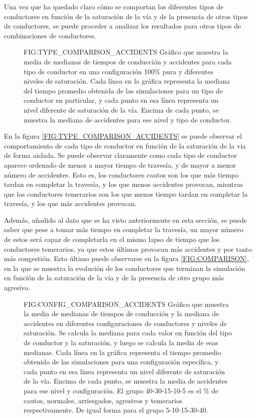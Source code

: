 Una vez que ha quedado claro cómo se comportan los diferentes tipos de conductores en función de la saturación de la vía y de la presencia
de otros tipos de conductores, se puede proceder a analizar los resultados para otros tipos de combinaciones de conductores.

\begin{figure}[Comparación de tiempos y accidentes por tipo de conductor]{FIG:TYPE_COMPARISON_ACCIDENTS}{
    Gráfico que muestra la media de medianas de tiempos de conducción y accidentes para cada tipo de conductor en una configuración 100\% pura y diferentes niveles de saturación.
    Cada línea en la gráfica representa la mediana del tiempo promedio obtenida de las simulaciones para un tipo de conductor en particular, y cada punto en esa línea representa un nivel diferente de saturación de la vía.
    Encima de cada punto, se muestra la mediana de accidentes para ese nivel y tipo de conductor.
}
\end{figure}

En la figura \ref{FIG:TYPE_COMPARISON_ACCIDENTS} se puede observar el comportamiento de cada tipo de conductor en función de la saturación de la vía
de forma aislada. Se puede observar claramente como cada tipo de conductor aparece ordenado de menor a mayor tiempo de travesía, y de mayor a menor
número de accidentes. Esto es, los conductores cautos son los que más tiempo tardan en completar la travesía, y los que menos accidentes provocan,
mientras que los conductores temerarios son los que menos tiempo tardan en completar la travesía, y los que más accidentes provocan.

Además, añadido al dato que se ha visto anteriormente en esta sección, se puede saber que pese a tomar más tiempo en completar la travesía,
un mayor número de estos será capaz de completarla en el mismo lapso de tiempo que los conductores temerarios, ya que estos últimos provocan
más accidentes y por tanto más congestión. Esto último puede observarse en la figura \ref{FIG:COMPARISON}, en la que se muestra la evolución
de los conductores que terminan la simulación en función de la saturación de la vía y de la presencia de otro grupo más agresivo.

\begin{figure}[Mediana de tiempos y accidentes en diferentes distribuciones]{FIG:CONFIG_COMPARISON_ACCIDENTS}{
    Gráfico que muestra la media de medianas de tiempos de conducción y la mediana de accidentes en diferentes configuraciones de conductores y niveles de saturación.
    Se calcula la mediana para cada valor en función del tipo de conductor y la saturación, y luego se calcula la media de esas medianas.
    Cada línea en la gráfica representa el tiempo promedio obtenido de las simulaciones para una configuración específica, y cada punto en esa línea representa un nivel diferente de saturación de la vía.
    Encima de cada punto, se muestra la media de accidentes para ese nivel y configuración.
    El grupo 40-30-15-10-5 es el \% de cautos, normales, arriesgados, agresivos y temerarios respectivamente. De igual forma para el grupo
    5-10-15-30-40.
}
\end{figure}

